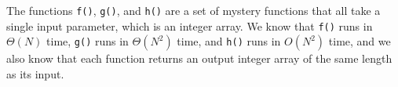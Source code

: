 The functions \lstinline{f()}, \lstinline{g()}, and \lstinline{h()} are a set of mystery functions that all take a single input parameter, which is an integer array. We know that \lstinline{f()} runs in $\Theta(N)$ time, \lstinline{g()} runs in $\Theta(N^2)$ time, and \lstinline{h()} runs in $O(N^2)$ time, and we also know that each function returns an output integer array of the same length as its input.
